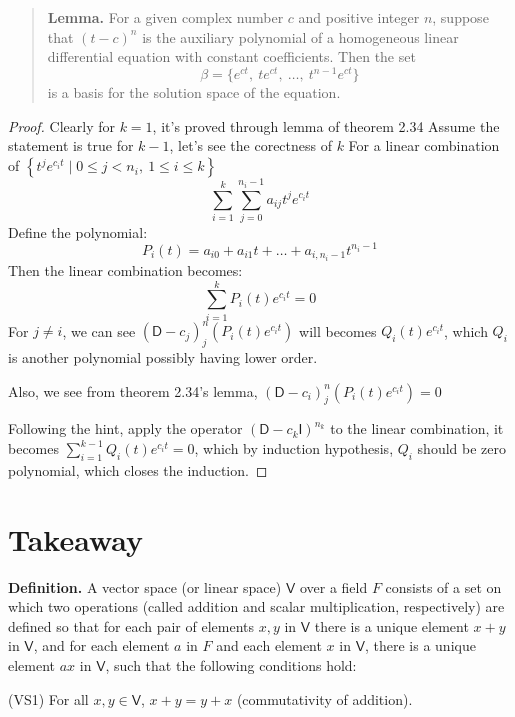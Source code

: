 \documentclass{article}
\newcommand{\0}{\mathit{0}}
\begin{document}
\begin{quotation}
    \textbf{Lemma.} For a given complex number $c$ and positive integer $n$, suppose that
    $(t - c)^n$ is the auxiliary polynomial of a homogeneous linear differential equation
    with constant coefficients. Then the set
    \[
        \beta = \{e^{ct},\ te^{ct},\ \dots,\ t^{n-1}e^{ct}\}
    \]
    is a basis for the solution space of the equation.
\end{quotation}

\begin{proof}
    Clearly for $k=1$, it's proved through lemma of theorem 2.34
    Assume the statement is true for $k-1$, let's see the corectness of $k$
    For a linear combination of $\left\{ t^j e^{c_i t} \mid 0 \leq j < n_i,\ 1 \leq i \leq k \right\}$
    \[\sum_{i=1}^k \sum_{j=0}^{n_i - 1} a_{ij} t^j e^{c_i t}\]
    Define the polynomial:
    \[
        P_i(t) = a_{i0} + a_{i1}t + \dots + a_{i,n_i - 1}t^{n_i - 1}
    \]
    Then the linear combination becomes:
    \[
        \sum_{i=1}^k P_i(t) e^{c_i t} = 0
    \]
    For $j\neq i$,
    we can see $(\mathsf{D}-c_j)^n_j(P_i(t) e^{c_i t})$ will becomes $Q_i(t) e^{c_i t}$, which
    $Q_i$ is another polynomial possibly having lower order.

    Also, we see from theorem 2.34's lemma,
    $(\mathsf{D}-c_i)^n_j(P_i(t) e^{c_i t})=\0$

    Following the hint, apply the operator $(\mathsf{D} - c_k \mathsf{I})^{n_k}$ to the linear
    combination, it becomes
    $\sum_{i=1}^{k-1} Q_i(t) e^{c_i t} = 0$, which by induction hypothesis, $Q_i$ should be
    zero polynomial, which closes the induction.
\end{proof}


\newpage

\section{Takeaway}

\textbf{Definition.}
A vector space (or linear space) $\mathsf{V}$ over a field $F$ consists of
a set on which two operations (called addition and scalar multiplication,
respectively) are defined so that for each pair of elements $x, y$ in
$\mathsf{V}$ there is a unique element $x + y$ in $\mathsf{V}$, and for
each element $a$ in $F$ and each element $x$ in $\mathsf{V}$, there is a
unique element $ax$ in $\mathsf{V}$, such that the following conditions hold:

(VS1) For all $x, y \in \mathsf{V}$, $x + y = y + x$ (commutativity of addition).
\end{document}
